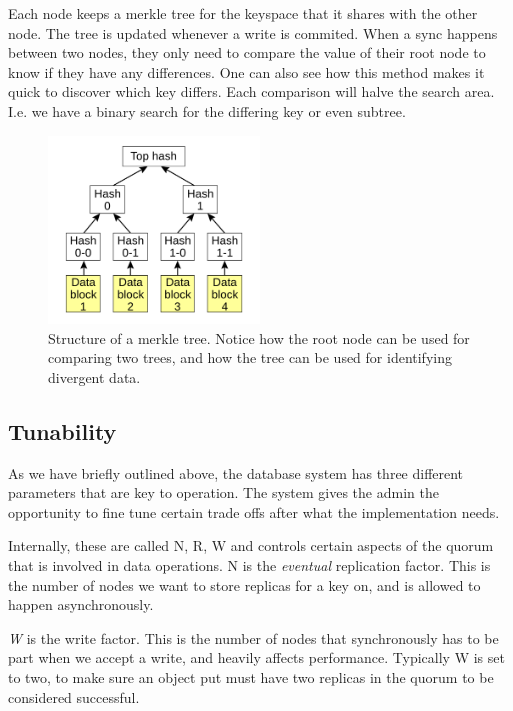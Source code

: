 Each node keeps a merkle tree for the keyspace that it shares with the other node. The tree is updated whenever a write is commited.
When a sync happens between two nodes, they only need to compare the value of their root node to know if they have any differences.
One can also see how this method makes it quick to discover which key differs. Each comparison will halve the search area.
I.e. we have a binary search for the differing key or even subtree.

\begin{figure}[h]
    \centering
    \includegraphics[width=0.5\textwidth]{background/figures/hashtree}
    \caption{Structure of a merkle tree. Notice how the root node can be used for comparing two trees, and how the tree can be used for identifying divergent data.}
    \label{fig:merkletree}
\end{figure}

\subsection{Tunability}
\label{sec:tunability}
As we have briefly outlined above, the database system has three different parameters that are key to operation.
The system gives the admin the opportunity to fine tune certain trade offs after what the implementation needs.

Internally, these are called N, R, W and controls certain aspects of the quorum that is involved in data operations. N is the \emph{eventual} replication factor.
This is the number of nodes we want to store replicas for a key on, and is allowed to happen asynchronously.

\emph{W} is the write factor. This is the number of nodes that synchronously has to be part when we accept a write, and heavily affects performance. 
Typically W is set to two, to make sure an object put must have two replicas in the quorum to be considered successful. 

